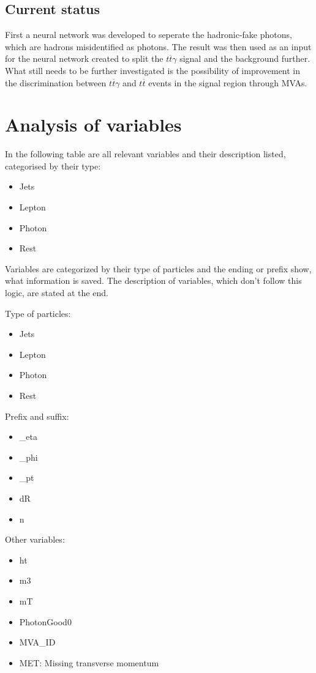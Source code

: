 \documentclass[11pt]{scrartcl}
\begin{document}
	\subsection{Current status}
	
	First a neural network was developed to seperate the hadronic-fake photons, which are hadrons misidentified as photons. The result was then used as an input for the neural network created to split the $t\overline{t}\gamma$ signal and the background further. What still needs to be further investigated is the possibility of improvement in the discrimination between $t\overline{t}\gamma$ and $t\overline{t}$ events in the signal region through MVAs.

\section{Analysis of variables}

In the following table are all relevant variables and their description listed, categorised by their type:
\begin{itemize}
  \item Jets
  \item Lepton
  \item Photon
  \item Rest
\end{itemize}

Variables are categorized by their type of particles and the ending or prefix show, what information is saved. The description of variables, which don't follow this logic, are stated at the end. 

Type of particles:
\begin{itemize}
  \item Jets
  \item Lepton
  \item Photon
  \item Rest
\end{itemize}

Prefix and suffix:
\begin{itemize}
	  \item \_eta
	  \item \_phi
	  \item \_pt
	  \item dR
	  \item n
\end{itemize}

Other variables:
\begin{itemize}
  \item ht
  \item m3
  \item mT
  \item PhotonGood0
  \item MVA\_ID
  \item MET: Missing transverse momentum
\end{itemize}
\end{document}
